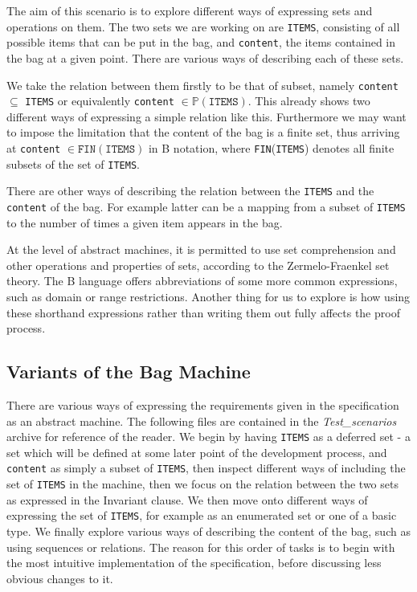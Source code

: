 \documentclass[11pt,journal]{IEEEtran}
\begin{document}
	The aim of this scenario is to explore different ways of expressing sets and operations on them. The two sets we are working on are \texttt{ITEMS}, consisting of all possible items that can be put in the bag, and \texttt{content}, the items contained in the bag at a given point. There are various ways of describing each of these sets. 
	
	We take the relation between them firstly to be that of subset, namely \texttt{content} $\subseteq$ \texttt{ITEMS} or equivalently \texttt{content} $\in \mathbb{P}(\texttt{ITEMS})$. This already shows two different ways of expressing a simple relation like this. Furthermore we may want to impose the limitation that the content of the bag is a finite set, thus arriving at \texttt{content} $\in \texttt{FIN}(\texttt{ITEMS})$ in B notation, where \texttt{FIN}(\texttt{ITEMS}) denotes all finite subsets of the set of \texttt{ITEMS}. 
	
	There are other ways of describing the relation between the \texttt{ITEMS} and the \texttt{content} of the bag. For example latter can be a mapping from a subset of \texttt{ITEMS} to the number of times a given item appears in the bag.
	
	At the level of abstract machines, it is permitted to use set comprehension and other operations and properties of sets, according to the Zermelo-Fraenkel set theory. The B language offers abbreviations of some more common expressions, such as domain or range restrictions. Another thing for us to explore is how using these shorthand expressions rather than writing them out fully affects the proof process.

	\subsection{Variants of the Bag Machine}
	There are various ways of expressing the requirements given in the specification as an abstract machine. The following files are contained in the \emph{Test\_scenarios} archive for reference of the reader. We begin by having \texttt{ITEMS} as a deferred set - a set which will be defined at some later point of the development process, and \texttt{content} as simply a subset of \texttt{ITEMS}, then inspect different ways of including the set of \texttt{ITEMS} in the machine, then we focus on the relation between the two sets as expressed in the Invariant clause. We then move onto different ways of expressing the set of \texttt{ITEMS}, for example as an enumerated set or one of a basic type. We finally explore various ways of describing the content of the bag, such as using sequences or relations. The reason for this order of tasks is to begin with the most intuitive implementation of the specification, before discussing less obvious changes to it.
	
\end{document}
